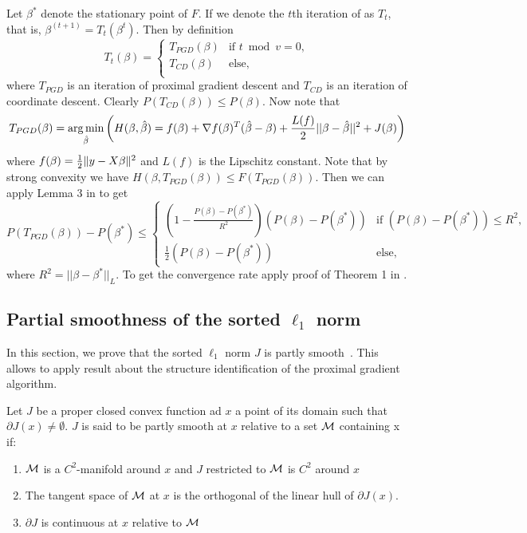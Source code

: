 Let $\beta^*$ denote the stationary point of $F$.
If we denote the $t$th iteration of  as $T_t$, that is, $\beta^{(t+1)} = T_t(\beta^{t})$. Then by definition
$$
T_t(\beta)=\begin{cases}
T_{PGD}(\beta) & \mbox{if } t\bmod v=0, \\
T_{CD}(\beta) & \mbox{else,}  \\
\end{cases}
$$
where $T_{PGD}$ is an iteration of proximal gradient descent and $T_{CD}$ is an iteration of coordinate descent. Clearly $P(T_{CD}(\beta)) \leq P(\beta)$. Now note that
$$
T_{PGD}(\beta)= \operatorname*{arg\,min}_{\hat{\beta}} \left( H(\beta,\hat{\beta}) = f(\beta) + \nabla f(\beta)^T (\hat{\beta} - \beta) + \frac{L(f)}{2} ||\beta-\hat{\beta}  ||^2+ J(\beta) \right)
$$ 
where $f(\beta) = \frac{1}{2} \lVert {y - X \beta} \rVert^2$ and $L(f)$ is the Lipschitz constant. Note that by strong convexity we have $H(\beta,T_{PGD}(\beta)) \leq F(T_{PGD}(\beta))$.
Then we can apply Lemma 3 in \textcite{richtarik2014}
to get
$$
P(T_{PGD}(\beta)) - P(\beta^*)  \leq 
\begin{cases}
\left(1 - \frac{P(\beta) - P(\beta^*)}{R^2} \right) \left( P(\beta) - P(\beta^*)\right) & \mbox{if } \left( P(\beta) - P(\beta^*) \right)\leq R^2, \\
\frac{1}{2}\left( P(\beta) - P(\beta^*)\right) & \mbox{else,}
\end{cases}
$$
where $R^2=||\beta- \beta^*||_L$. To get the convergence rate apply proof of Theorem 1 in \textcite{richtarik2014}.

\subsection{Partial smoothness of the sorted $\ell_1$ norm}
\label{app:sec:partly_smooth}
In this section, we prove that the sorted $\ell_1$ norm $J$ is partly smooth~\parencite{lewis2002a}.
This allows to apply result about the structure identification of the proximal gradient algorithm.

\begin{definition}
  Let $J$ be a proper closed convex function ad $x$ a point of its domain such that $\partial J(x) \neq \emptyset$.
  $J$ is said to be partly smooth at $x$ relative to a set $\mathcal{M}$ containing x if:
  \begin{enumerate}
    \item $\mathcal{M}$ is a $C^2$-manifold around $x$ and $J$ restricted to $\mathcal{M}$ is $C^2$ around $x$
    \item The tangent space of $\mathcal{M}$ at $x$ is the orthogonal of the linear hull of $\partial J(x)$.
    \item $\partial J$ is continuous at $x$ relative to $\mathcal{M}$
  \end{enumerate}
\end{definition}

